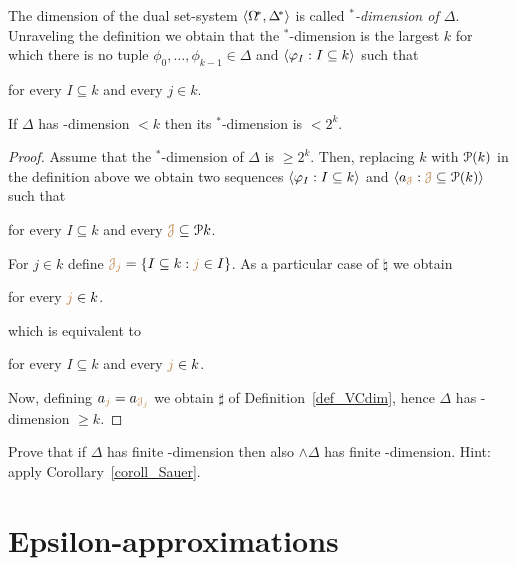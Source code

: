 \documentclass[creche.tex]{subfiles}
\begin{document}
The dimension of the dual set-system $\<\Omega\!^*,\Delta\!^*\>$ is called \emph{\vc$^*\!$-dimension of $\Delta$}. Unraveling the definition we obtain that the \vc$^*\!$-dimension is the largest $k$ for which there is no tuple $\phi_0,\dots,\phi_{k-1}\in\Delta$ and $\<\phi_I: I\subseteq k\>$ such that

\qquad for every $I\subseteq k$ and every $j\in k$.


\begin{proposition}\label{prop_vc*}
If  $\Delta$ has \vc-dimension $<k$ then its \vc$^*\!$-dimension is $<2^k$.
\end{proposition}

\begin{proof}
Assume that the \vc$^*\!$-dimension of $\Delta$ is $\ge 2^k$. Then, replacing  $k$ with $\P(k)$ in the definition above we obtain two sequences $\<\phi_I: I\subseteq k\>$ and $\<a_{\mr \J}: {\mr \J}\subseteq \P(k)\>$ such that

\qquad for every $I\subseteq k$ and every ${\mr \J}\subseteq \P k$.

For $j\in k$ define ${\mr \J_j}=\{I\subseteq k: {\mr j}\in I\}$. As a particular case of $\natural$ we obtain

\qquad for every ${\mr j}\in k$.

which is equivalent to

\qquad for every $I\subseteq k$ and every ${\mr j}\in k$.

Now, defining $a_{\mr j}=a_{\mr \J_j}$ we obtain $\sharp$ of Definition~\ref{def_VCdim}, hence $\Delta$ has \vc-di\-mens\-ion $\ge k$.
\end{proof}

\begin{exercise}
Prove that if $\Delta$ has finite \vc-dimension then also $\wedge\Delta$ has finite \vc-dimension.  Hint: apply Corollary~\ref{coroll_Sauer}.
\end{exercise}

 
\section{Epsilon-approximations}\label{epsilon_approximations}
\end{document}
